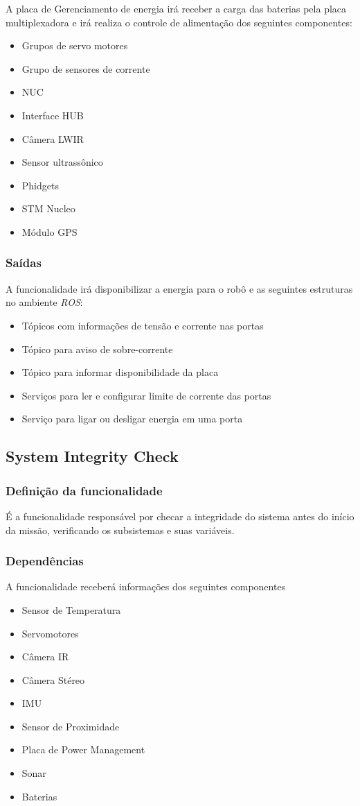 A placa de Gerenciamento de energia irá receber a carga das baterias pela placa multiplexadora e irá realiza o controle de alimentação dos seguintes componentes:
\begin{itemize}
	\item Grupos de servo motores
	\item Grupo de sensores de corrente
	\item NUC
	\item Interface HUB
	\item Câmera LWIR
	\item Sensor ultrassônico
	\item Phidgets
	\item STM Nucleo
	\item Módulo GPS
\end{itemize}

\subsubsection{Saídas}
A funcionalidade irá disponibilizar a energia para o robô e as seguintes estruturas no ambiente \textit{ROS}:
\begin{itemize}
	\item Tópicos com informações de tensão e corrente nas portas
	\item Tópico para aviso de sobre-corrente
	\item Tópico para informar disponibilidade da placa
	\item Serviços para ler e configurar limite de corrente das portas
	\item Serviço para ligar ou desligar energia em uma porta	
\end{itemize}

\subsection{System Integrity Check}
\label{ssec:check}

\subsubsection{Definição da funcionalidade}
É a funcionalidade responsável por checar a integridade do sistema antes do início da missão, verificando os subsistemas e suas variáveis.

\subsubsection{Dependências}
A funcionalidade receberá informações dos seguintes componentes
\begin{itemize}
	\item Sensor de Temperatura
	\item Servomotores
	\item Câmera IR
	\item Câmera Stéreo
	\item IMU
	\item Sensor de Proximidade
	\item Placa de Power Management
	\item Sonar 
	\item Baterias
\end{itemize}

